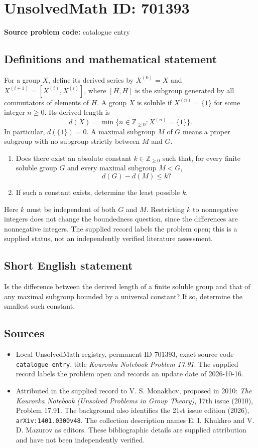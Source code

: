 \documentclass[11pt]{article}
\newcommand{\Z}{\mathbb{Z}}
\begin{document}
\section*{UnsolvedMath ID: 701393}
\textbf{Source problem code:} catalogue entry
\subsection{Definitions and mathematical statement}
For a group \(X\), define its derived series by \(X^{(0)}=X\) and \(X^{(i+1)}=[X^{(i)},X^{(i)}]\), where \([H,H]\) is the subgroup generated by all commutators of elements of \(H\). A group \(X\) is soluble if \(X^{(n)}=\{1\}\) for some integer \(n\geq 0\). Its derived length is
\[
d(X)=\min\{n\in\Z_{\geq 0}:X^{(n)}=\{1\}\}.
\]
In particular, \(d(\{1\})=0\). A maximal subgroup \(M\) of \(G\) means a proper subgroup with no subgroup strictly between \(M\) and \(G\).

\begin{enumerate}
\item[(a)] Does there exist an absolute constant \(k\in\Z_{\geq 0}\) such that, for every finite soluble group \(G\) and every maximal subgroup \(M<G\),
\[
d(G)-d(M)\leq k?
\]
\item[(b)] If such a constant exists, determine the least possible \(k\).
\end{enumerate}
Here \(k\) must be independent of both \(G\) and \(M\). Restricting \(k\) to nonnegative integers does not change the boundedness question, since the differences are nonnegative integers. The supplied record labels the problem open; this is a supplied status, not an independently verified literature assessment.
\subsection{Short English statement}
Is the difference between the derived length of a finite soluble group and that of any maximal subgroup bounded by a universal constant? If so, determine the smallest such constant.
\subsection{Sources}
\begin{itemize}
\item Local UnsolvedMath registry, permanent ID \(701393\), exact source code \texttt{catalogue entry}, title \emph{Kourovka Notebook Problem 17.91}. The supplied record labels the problem open and records an update date of 2026-10-16.
\item Attributed in the supplied record to V. S. Monakhov, proposed in 2010: \emph{The Kourovka Notebook (Unsolved Problems in Group Theory)}, 17th issue (2010), Problem 17.91. The background also identifies the 21st issue edition (2026), \texttt{arXiv:1401.0300v48}. The collection description names E. I. Khukhro and V. D. Mazurov as editors. These bibliographic details are supplied attribution and have not been independently verified.
\end{itemize}
\end{document}
